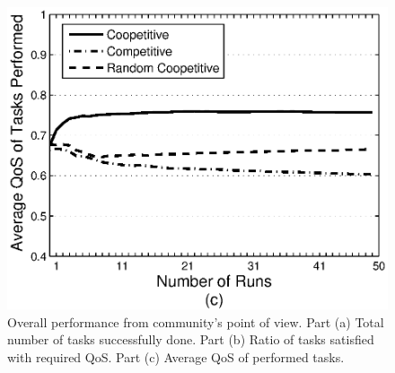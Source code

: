 \begin{figure}[h]
\includegraphics[scale=0.35]{graphavgqostask.eps}
\caption{Overall performance from community's point of view. Part
(a) Total number of tasks successfully done. Part (b) Ratio of
tasks satisfied with required QoS. Part (c) Average QoS of
performed tasks.} \label{graph_task}
\end{figure}

